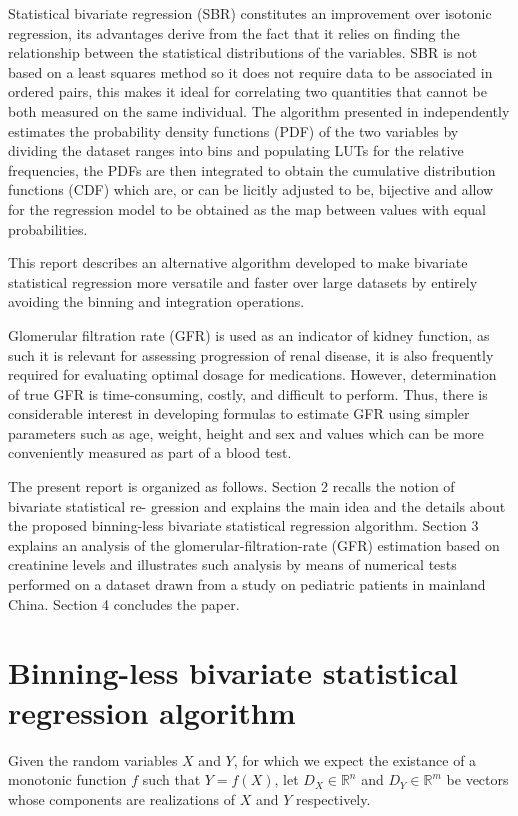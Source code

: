 \documentclass[10pt,final]{siamltex}
\begin{document}
Statistical bivariate regression (SBR) constitutes an improvement over isotonic regression, its advantages derive from the fact that it relies on finding the relationship between the statistical distributions of the variables. SBR is not based on a least squares method so it does not require data to be associated in ordered pairs, this makes it ideal for correlating two quantities that cannot be both measured on the same individual. The algorithm presented in \cite{fiori} independently estimates the probability density functions (PDF) of the two variables by dividing the dataset ranges into bins and populating LUTs for the relative frequencies, the PDFs are then integrated to obtain the cumulative distribution functions (CDF) which are, or can be licitly adjusted to be, bijective and allow for the regression model to be obtained as the map between values with equal probabilities.

This report describes an alternative algorithm developed to make bivariate statistical regression more versatile and faster over large datasets by entirely avoiding the binning and integration operations.

Glomerular filtration rate (GFR) is used as an indicator of kidney function, as such it is relevant for  assessing progression of renal disease, it is also frequently required for evaluating optimal dosage for medications. However, determination of true GFR is time-consuming, costly, and difficult to perform. Thus, there is considerable interest in developing formulas to estimate GFR using simpler parameters such as age, weight, height and sex and values which can be more conveniently measured as part of a blood test.

The present report is organized as follows. Section 2 recalls the notion of bivariate statistical re- gression and explains the main idea and the details about the proposed binning-less bivariate statistical regression algorithm. Section 3 explains an analysis of the glomerular-filtration-rate (GFR) estimation based on creatinine levels and illustrates such analysis by means of numerical tests performed on a dataset drawn from a study on pediatric patients in mainland China. Section 4 concludes the paper.
%
\section{Binning-less bivariate statistical regression algorithm}
%
Given the random variables $X$ and $Y$, for which we expect the existance of a monotonic function $f$ such that $Y=f(X)$, let $D_X \in \mathbb{R}^n$ and $D_Y \in \mathbb{R}^m$ be vectors whose components are realizations of $X$ and $Y$ respectively.
\end{document}
